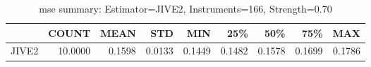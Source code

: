\begin{table}[ht]
\centering
\caption{mse summary: Estimator=JIVE2, Instruments=166, Strength=0.70}
\begin{tabular}{lrrrrrrrr}
\toprule
 & COUNT & MEAN & STD & MIN & 25\% & 50\% & 75\% & MAX \\
\midrule
JIVE2 & 10.0000 & 0.1598 & 0.0133 & 0.1449 & 0.1482 & 0.1578 & 0.1699 & 0.1786 \\
\bottomrule
\end{tabular}
\end{table}
